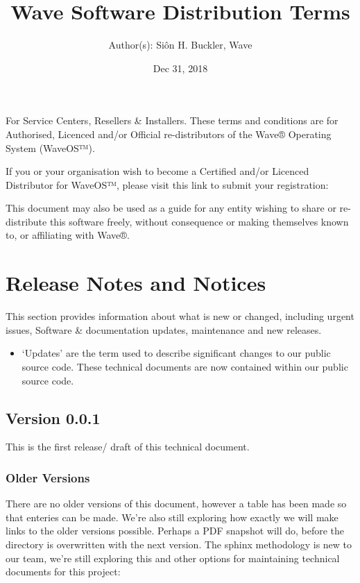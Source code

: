 \documentclass[letterpaper,10pt,english]{sphinxmanual}
\title{Wave Software Distribution Terms}
\date{Dec 31, 2018}
\author{Author(s): Siôn H. Buckler, Wave}
\begin{document}
\maketitle
\sphinxtableofcontents
{}\label{\detokenize{index::doc}}


For Service Centers, Resellers \& Installers. These terms and conditions are for Authorised, Licenced and/or Official re-distributors of the Wave® Operating System (WaveOS™).

If you or your organisation wish to become a Certified and/or Licenced Distributor for WaveOS™, please visit this link to submit your registration:  

This document may also be used as a guide for any entity wishing to share or re-distribute this software freely, without consequence or making themselves known to, or affiliating with Wave®.


\chapter{Release Notes and Notices}
\label{\detokenize{releasenotes:release-notes-and-notices}}\label{\detokenize{releasenotes::doc}}
This section provides information about what is new or changed, including urgent issues, Software \& documentation updates, maintenance and new releases.
\begin{itemize}
\item {} 
‘Updates’ are the term used to describe significant changes to our public source code. These technical documents are now contained within our public source code.

\end{itemize}


\section{Version 0.0.1}
\label{\detokenize{releasenotes:version-0-0-1}}
This is the first release/ draft of this technical document.


\subsection{Older Versions}
\label{\detokenize{releasenotes:older-versions}}
There are no older versions of this document, however a table has been made so that enteries can be made. We’re also still exploring how exactly we will make links to the older versions possible. Perhaps a PDF snapshot will do, before the directory is overwritten with the next version. The sphinx methodology is new to our team, we’re still exploring this and other options for maintaining technical documents for this project:
\end{document}
